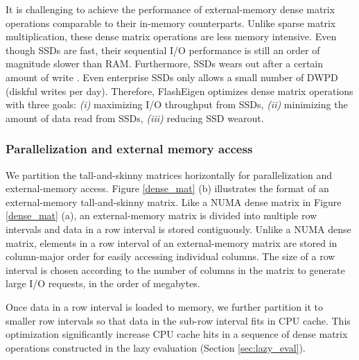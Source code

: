 It is challenging to achieve the performance of external-memory dense matrix
operations comparable to their in-memory counterparts. Unlike sparse matrix
multiplication, these dense matrix operations are less memory intensive.
Even though SSDs are fast, their sequential I/O performance is still an order
of magnitude slower than RAM.
Furthermore, SSDs wears out after a certain amount of write \cite{}.
Even enterprise SSDs \cite{} only allows a small number of DWPD
(diskful writes per day). Therefore, FlashEigen optimizes dense matrix operations
with three goals: \textit{(i)} maximizing I/O throughput from SSDs,
\textit{(ii)} minimizing the amount of data read from SSDs,
\textit{(iii)} reducing SSD wearout.

%		

\subsubsection{Parallelization and external memory access} \label{par_em}
We partition the tall-and-skinny matrices horizontally for parallelization
and external-memory access. Figure \ref{dense_mat} (b) illustrates the format
of an external-memory tall-and-skinny matrix. Like a NUMA dense matrix in
Figure \ref{dense_mat} (a),
an external-memory matrix is divided into multiple row intervals and data
in a row interval is stored contiguously. Unlike a NUMA dense matrix, elements
in a row interval of an external-memory matrix are stored in column-major order
for easily accessing individual columns. The size of a row interval is chosen
according to the number of columns in the matrix to generate large I/O requests,
in the order of megabytes.

Once data in a row interval is loaded to memory, we further partition it to
smaller row intervals so that data
in the sub-row interval fits in CPU cache.  This optimization significantly
increase CPU cache hits in a sequence of dense matrix operations constructed in
the lazy evaluation (Section \ref{sec:lazy_eval}).

